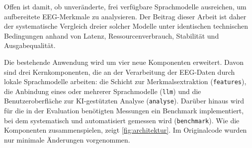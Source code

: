 \noindent Offen ist damit, ob unveränderte, frei verfügbare Sprachmodelle ausreichen, um aufbereitete \ac{EEG}-Merkmale zu analysieren. Der Beitrag dieser Arbeit ist daher der systematische Vergleich dreier solcher Modelle unter identischen technischen Bedingungen anhand von Latenz, Ressourcenverbrauch, Stabilität und Ausgabequalität.
\vspace{\baselineskip}

\noindent Die bestehende Anwendung wird um vier neue Komponenten erweitert. Davon sind drei Kernkomponenten, die an der Verarbeitung der \ac{EEG}-Daten durch lokale Sprachmodelle arbeiten: die Schicht zur Merkmalsextraktion (\texttt{features}), die Anbindung eines oder mehrerer Sprachmodelle (\texttt{llm}) und die Benutzeroberfläche zur KI-gestützten Analyse (\texttt{analyse}). Darüber hinaus wird für die in der Evaluation benötigten Messungen ein Benchmark implementiert, bei dem systematisch und automatisiert gemessen wird (\texttt{benchmark}). Wie die Komponenten zusammenspielen, zeigt \autoref{fig:architektur}. Im Originalcode wurden nur minimale Änderungen vorgenommen.